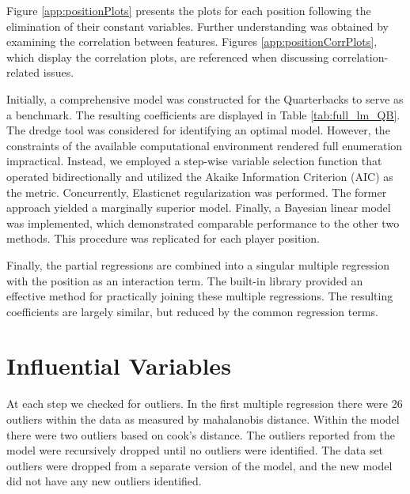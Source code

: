 Figure \ref{app:positionPlots} presents the plots for each position following the elimination of their constant variables. Further understanding was obtained by examining the correlation between features. Figures \ref{app:positionCorrPlots}, which display the correlation plots, are referenced when discussing correlation-related issues.

Initially, a comprehensive model was constructed for the Quarterbacks to serve as a benchmark. The resulting coefficients are displayed in Table \ref{tab:full_lm_QB}. 
The dredge tool was considered for identifying an optimal model. However, the constraints of the available computational environment rendered full enumeration impractical.
Instead, we employed a step-wise variable selection function that operated bidirectionally and 
utilized the Akaike Information Criterion (AIC) \cite{akaike1998} as the metric. 
Concurrently, Elasticnet regularization was performed. 
The former approach yielded a marginally superior model.
Finally, a Bayesian linear model was implemented, which demonstrated comparable performance to the other two methods.
This procedure was replicated for each player position.












Finally, the partial regressions are combined into a singular multiple regression with the position as an interaction term.
The built-in library provided an effective method for practically joining these multiple regressions. 
The resulting coefficients are largely similar, but reduced by the common regression terms.




\section{Influential Variables}

At each step we checked for outliers.
In the first multiple regression there were 26 outliers within the data as measured by mahalanobis distance.
Within the model there were two outliers based on cook's distance.
The outliers reported from the model were recursively dropped until no outliers were identified.
The data set outliers were dropped from a separate version of the model, 
and the new model did not have any new outliers identified.


